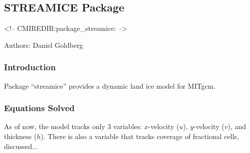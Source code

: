 \subsection{STREAMICE Package}
\label{sec:pkg:streamice}
\begin{rawhtml}
<!-- CMIREDIR:package_streamice: -->
\end{rawhtml}

Authors: Daniel Goldberg

\subsubsection{Introduction}


Package ``streamice'' provides a dynamic land ice model for MITgcm.


\subsubsection{Equations Solved}

As of now, the model tracks only 3 variables: $x$-velocity ($u$), $y$-velocity
($v$), and thickness ($h$). There is also a variable that tracks coverage of
fractional cells, discussed...

